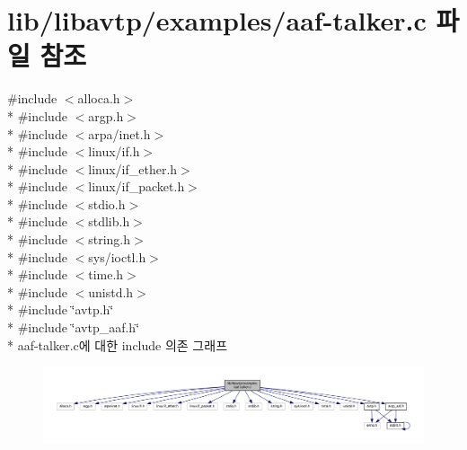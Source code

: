 \hypertarget{aaf-talker_8c}{}\section{lib/libavtp/examples/aaf-\/talker.c 파일 참조}
\label{aaf-talker_8c}
{\ttfamily \#include $<$alloca.\+h$>$}\\*
{\ttfamily \#include $<$argp.\+h$>$}\\*
{\ttfamily \#include $<$arpa/inet.\+h$>$}\\*
{\ttfamily \#include $<$linux/if.\+h$>$}\\*
{\ttfamily \#include $<$linux/if\+\_\+ether.\+h$>$}\\*
{\ttfamily \#include $<$linux/if\+\_\+packet.\+h$>$}\\*
{\ttfamily \#include $<$stdio.\+h$>$}\\*
{\ttfamily \#include $<$stdlib.\+h$>$}\\*
{\ttfamily \#include $<$string.\+h$>$}\\*
{\ttfamily \#include $<$sys/ioctl.\+h$>$}\\*
{\ttfamily \#include $<$time.\+h$>$}\\*
{\ttfamily \#include $<$unistd.\+h$>$}\\*
{\ttfamily \#include \char`\"{}avtp.\+h\char`\"{}}\\*
{\ttfamily \#include \char`\"{}avtp\+\_\+aaf.\+h\char`\"{}}\\*
aaf-\/talker.c에 대한 include 의존 그래프
\nopagebreak
\begin{figure}[H]
\begin{center}
\leavevmode
\includegraphics[width=350pt]{aaf-talker_8c__incl}
\end{center}
\end{figure}

